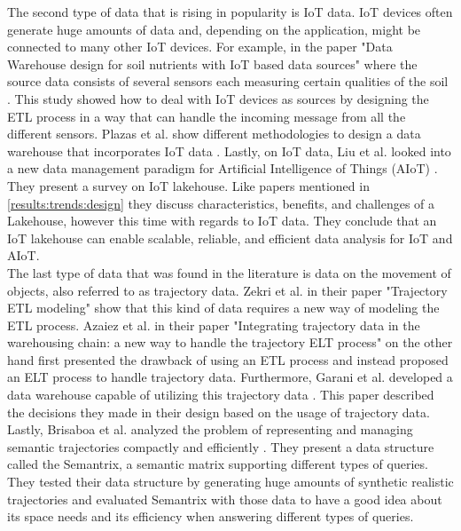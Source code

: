 \documentclass[11pt]{article}
\begin{document}
The second type of data that is rising in popularity is IoT data. IoT devices often generate huge amounts of data and, depending on the application, might be connected to many other IoT devices. For example, in the paper "Data Warehouse design for soil nutrients with IoT based data sources" where the source data consists of several sensors each measuring certain qualities of the soil \cite{Rahman2019181}. This study showed how to deal with IoT devices as sources by designing the ETL process in a way that can handle the incoming message from all the different sensors. Plazas et al. show different methodologies to design a data warehouse that incorporates IoT data \cite{Plazas202084}. Lastly, on IoT data, Liu et al. looked into a new data management paradigm for Artificial Intelligence of Things (AIoT) \cite{Liu202334}. They present a survey on IoT lakehouse. Like papers mentioned in \ref{results:trends:design} they discuss characteristics, benefits, and challenges of a Lakehouse, however this time with regards to IoT data. They conclude that an IoT lakehouse can enable scalable, reliable, and efficient data analysis for IoT and AIoT. \\

The last type of data that was found in the literature is data on the movement of objects, also referred to as trajectory data. Zekri et al. in their paper "Trajectory ETL modeling" \cite{Zekri2018380} show that this kind of data requires a new way of modeling the ETL process. Azaiez et al. in their paper "Integrating trajectory data in the warehousing chain: a new way to handle the trajectory ELT process" \cite{Azaiez2018353} on the other hand first presented the drawback of using an ETL process and instead proposed an ELT process to handle trajectory data. Furthermore, Garani et al. developed a data warehouse capable of utilizing this trajectory data \cite{Garani202388}. This paper described the decisions they made in their design based on the usage of trajectory data. Lastly, Brisaboa et al. analyzed the problem of representing and managing semantic trajectories compactly and efficiently \cite{RodriguezBrisaboa2020113}. They present a data structure called the Semantrix, a semantic matrix supporting different types of queries. They tested their data structure by generating huge amounts of synthetic realistic trajectories and evaluated Semantrix with those data to have a good idea about its space needs and its efficiency when answering different types of queries. \\
\end{document}
